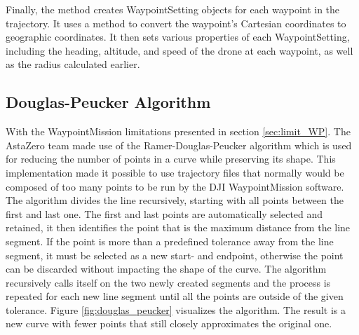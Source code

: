 Finally, the method creates WaypointSetting objects for each waypoint in the trajectory. It uses a method to convert the waypoint's Cartesian coordinates to geographic coordinates. It then sets various properties of each WaypointSetting, including the heading, altitude, and speed of the drone at each waypoint, as well as the radius calculated earlier.

\subsection{Douglas-Peucker Algorithm} \label{douglas_puecker}
With the WaypointMission limitations presented in section \ref{sec:limit_WP}. The AstaZero team made use of the Ramer-Douglas-Peucker algorithm which is used for reducing the number of points in a curve while preserving its shape. %
This implementation made it possible to use trajectory files that normally would be composed of too many points to be run by the DJI WaypointMission software. \\  

The algorithm divides the line recursively, starting with all points between the first and last one. The first and last points are automatically selected and retained, it then identifies the point that is the maximum distance from the line segment. If the point is more than a predefined tolerance away from the line segment, it must be selected as a new start- and endpoint, otherwise the point can be discarded without impacting the shape of the curve. The algorithm recursively calls itself on the two newly created segments and the process is repeated for each new line segment until all the points are outside of the given tolerance. Figure \ref{fig:douglas_peucker} visualizes the algorithm. The result is a new curve with fewer points that still closely approximates the original one.

